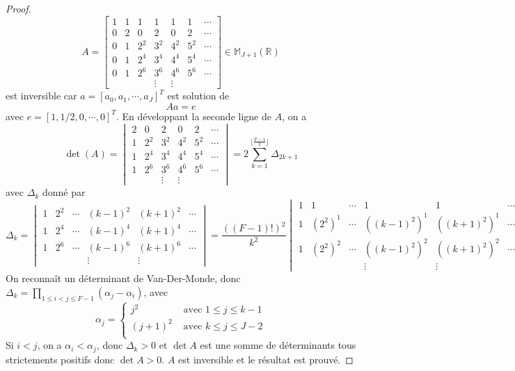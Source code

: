 \begin{proof}
\begin{equation}
A=\begin{bmatrix}
1 &  1  &  1  &  1  &  1  &  1  & \cdots\\  
0 &  2  &  0  &  2  &  0  & 2  & \cdots\\
0 &  1  & 2^2 & 3^2 & 4^2 & 5^2 & \cdots\\
0 &  1  & 2^4 & 3^4 & 4^4 & 5^4 & \cdots\\
0 &  1  & 2^6 & 3^6 & 4^6 & 5^6 & \cdots\\
&&& \vdots &  \vdots &
\end{bmatrix} \in \mathbb{M}_{J+1} \left( \mathbb{R} \right)
\end{equation}
est inversible car $a = [a_0, a_1, \cdots, a_J]^T$ est solution de 
\begin{equation}
A a = e
\end{equation}
avec $e = [1,1/2, 0,\cdots,0]^T$. En développant la seconde ligne de $A$, on a
\begin{equation}
\det ( A ) = \begin{vmatrix} 
2  &  0  &  2  &  0  & 2  & \cdots\\
1  & 2^2 & 3^2 & 4^2 & 5^2 & \cdots\\
1  & 2^4 & 3^4 & 4^4 & 5^4 & \cdots\\
1  & 2^6 & 3^6 & 4^6 & 5^6 & \cdots\\
& & \vdots &  \vdots &
\end{vmatrix} = 2 \sum_{k=1}^{\lfloor\frac{F-1}{2}\rfloor} \Delta_{2k+1}
\end{equation}
avec $\Delta_k$ donné par
\begin{equation}
\Delta_k = \begin{vmatrix} 
1 & 2^2 & \cdots & (k-1)^2 & (k+1)^2 & \cdots\\
1 & 2^4 & \cdots & (k-1)^4 & (k+1)^4 & \cdots\\
1 & 2^6 & \cdots & (k-1)^6 & (k+1)^6 & \cdots\\
&&& \vdots &  \vdots &
\end{vmatrix} = \dfrac{((F-1)!)^2}{k^2} \begin{vmatrix} 
1 & 1 & \cdots & 1 & 1 & \cdots\\
1 & (2^2)^1 & \cdots & ((k-1)^2)^1 & ((k+1)^2)^1 & \cdots\\
1 & (2^2)^2 & \cdots & ((k-1)^2)^2 & ((k+1)^2)^2 & \cdots\\
&&& \vdots &  \vdots &
\end{vmatrix}
\end{equation}
On reconnaît un déterminant de Van-Der-Monde, donc $\Delta_k = \prod_{1 \leq i < j \leq F-1} \left( \alpha_j - \alpha_i \right)$, avec 
\begin{equation}
\alpha_j = \left\lbrace
\begin{array}{ll}
j^2 & \text{ avec } 1 \leq j \leq k-1\\
(j+1)^2 & \text{ avec } k \leq j \leq J-2\\
\end{array}
\right.
\end{equation}
Si $i<j$, on a $\alpha_i < \alpha_j$, donc $\Delta_k>0$ et $\det A$ est une somme de déterminants tous strictements positifs donc $\det A > 0$. $A$ est inversible et le résultat est prouvé.
\end{proof}
